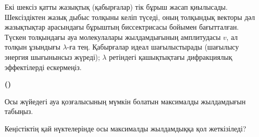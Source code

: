 
Екі шексіз қатты жазықтық (қабырғалар) тік бұрыш жасап қиылысады. Шексіздіктен жазық дыбыс толқыны келіп түседі, оның толқындық векторы дәл жазықтықтар арасындағы бұрыштың биссектрисасы бойымен бағытталған. Түскен толқындағы ауа молекулалары жылдамдығының амплитудасы $v$, ал толқын ұзындығы $\lambda$-ға тең. Қабырғалар идеал шағылыстырады (шағылысу энергия шығынынсыз жүреді); $\lambda$ ретіндегі қашықтықтағы дифракциялық эффектілерді ескермеңіз.

\setcounter{taskstar}{0}
\begin{list}{\textbf{()}\ }{
\setlength{\leftmargin}{18pt}%
\setlength{\labelwidth}{0pt}%
\setlength{\labelsep}{0pt}%
\setlength{\itemsep}{6pt}%
\setlength{\topsep}{6pt}}
\item Осы жүйедегі ауа қозғалысының мүмкін болатын максималды жылдамдығын табыңыз.
\item Кеңістіктің қай нүктелерінде осы максималды жылдамдыққа қол жеткізіледі?
\end{list}
